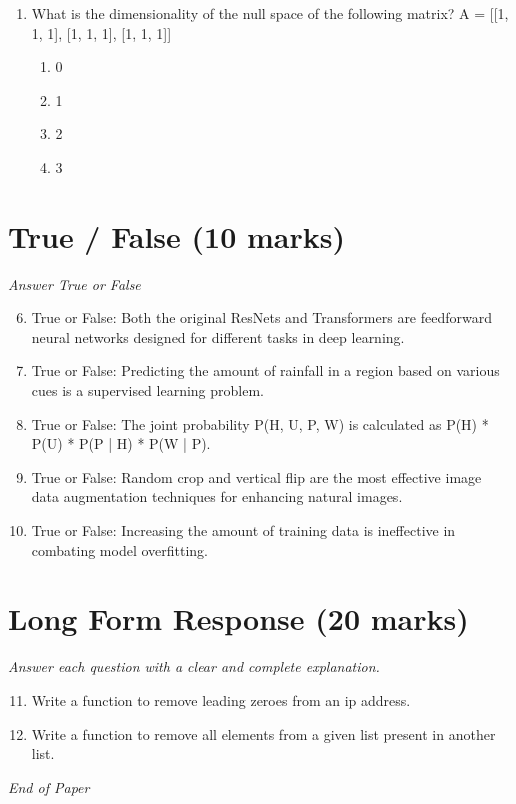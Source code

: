 \documentclass[12pt]{article}
\begin{document}
\begin{enumerate}[label=\arabic*.]
\begin{enumerate}[label=(\alph*)]
    \item 4
    \item 8
    \item 16
\end{enumerate}
\item What is the dimensionality of the null space of the following matrix? A = [[1, 1, 1], [1, 1, 1], [1, 1, 1]]
\begin{enumerate}[label=(\alph*)]
    \item 0
    \item 1
    \item 2
    \item 3
\end{enumerate}
\end{enumerate}

\section*{True / False (10 marks)}
\textit{Answer True or False}
\begin{enumerate}[label=\arabic*.]
\setcounter{enumi}{5}
\item True or False: Both the original ResNets and Transformers are feedforward neural networks designed for different tasks in deep learning.
\item True or False: Predicting the amount of rainfall in a region based on various cues is a supervised learning problem.
\item True or False: The joint probability P(H, U, P, W) is calculated as P(H) * P(U) * P(P | H) * P(W | P).
\item True or False: Random crop and vertical flip are the most effective image data augmentation techniques for enhancing natural images.
\item True or False: Increasing the amount of training data is ineffective in combating model overfitting.
\end{enumerate}

\section*{Long Form Response (20 marks)}
\textit{Answer each question with a clear and complete explanation.}
\begin{enumerate}[label=\arabic*.]
\setcounter{enumi}{10}
\item Write a function to remove leading zeroes from an ip address.
\item Write a function to remove all elements from a given list present in another list.
\end{enumerate}

\vfill
\noindent\textit{End of Paper}
\end{document}
